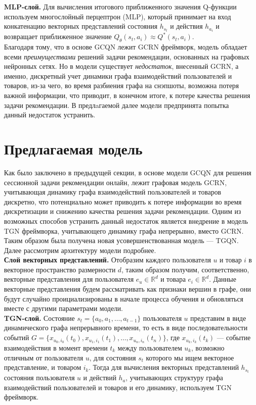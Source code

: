\documentclass{mipt-thesis-ms}
\begin{document}
{\bf MLP-слой.} Для вычисления итогового приближенного значения Q-функции используем многослойный перцептрон (MLP), который принимает на вход конкатенацию векторных представлений состояния $h_{s_t}$ и действия $h_{a_i}$ и возвращает приближенное значение $Q_{\theta}(s_t, a_i) \approx Q^*(s_t, a_i)$.\\

Благодаря тому, что в основе GCQN лежит GCRN фреймворк, модель обладает всеми {\it преимуществами} решений задачи рекомендации, основанных на графовых нейронных сетях. Но в модели существует {\it недостаток}, внесенный GCRN, а именно, дискретный учет динамики графа взаимодействий пользователей и товаров, из-за чего, во время разбиения графа на снэпшоты, возможна потеря важной информации, что приводит, в конечном итоге, к потере качества решения задачи рекомендации. В предлaгаемой далее модели предпринята попытка данный недостаток устранить.

\section{Предлагаемая модель}

Как было заключено в предыдущей секции, в основе модели GCQN для решения сессионной задачи рекомендации онлайн, лежит графовая модель GCRN, учитывающая динамику графа взаимодействий пользователей и товаров дискретно, что потенциально может приводить к потере информации во время дискретизации и снижению качества решения задачи рекомендации. Одним из возможных способов устранить данный недостаток является внедрение в модель TGN фреймворка, учитывающего динамику графа непрерывно, вместо GCRN. Таким образом была получена новая усовершенствованная модель --- TGQN. Далее рассмотрим архитектуру модели подробнее.
\\

{\bf Слой векторных представлений.} Отобразим каждого пользователя $u$ и товар $i$ в векторное пространство размерности $d$, таким образом получим, соответственно, векторные представления для пользователя $e_u \in \mathbb{R}^d$ и товара $e_i \in \mathbb{R}^d$. Данные векторные представления будем рассматривать как признаки вершин в графе, они будут случайно проициализированы в начале процесса обучения и обновляться вместе с другими параметрами модели.\\

{\bf TGN-слой.} Состояние $s_t = \{a_0, a_1, \dots, a_{t-1}\}$ пользователя $u$ представим в виде динамического графа непрерывного времени, то есть в виде последовательности событий $G = \{x_{u_0, i_0}(t_0), x_{u_1, i_1}(t_1), \dots, x_{u_n, i_n}(t_n)\}$, где $x_{u_k, i_k}(t_{k})$ --- событие взаимодействия в момент времени $t_k$ между пользователем $u_k$, возможно отличным от пользователя $u$, для состояния $s_t$ которого мы ищем векторное представление, и товаром $i_k$. Тогда для вычисления векторных представлений $h_{s_t}$ состояния пользователя $u$ и действий $h_a$, учитывающих структуру графа взаимодействий пользователей и товаров и его динамику, используем TGN фреймворк.\\
\end{document}
